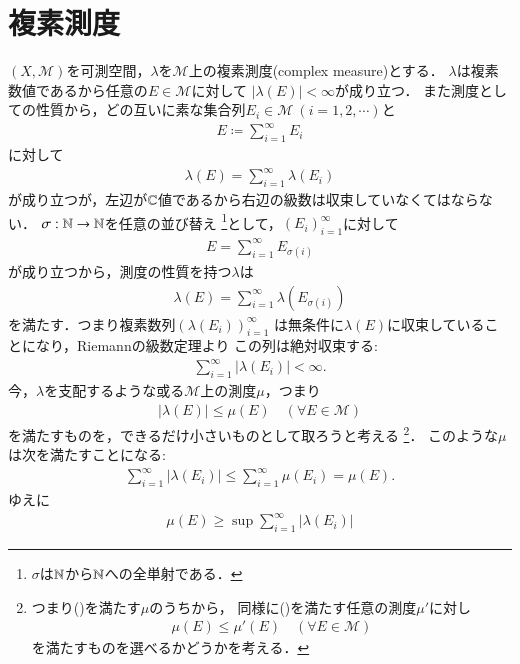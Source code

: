 \section{複素測度}
	$(X,\mathcal{M})$を可測空間，$\lambda$を$\mathcal{M}$上の複素測度(complex measure)とする．
	$\lambda$は複素数値であるから任意の$E \in \mathcal{M}$に対して
	$|\lambda(E)| < \infty$が成り立つ．
	また測度としての性質から，どの互いに素な集合列$E_i \in \mathcal{M}\ (i=1,2,\cdots)$と
	\begin{align}
		E \coloneqq \sum_{i=1}^{\infty} E_i
	\end{align}
	に対して
	\begin{align}
		\lambda(E) = \sum_{i=1}^{\infty} \lambda(E_i)
	\end{align}
	が成り立つが，左辺が$\mathbb{C}$値であるから右辺の級数は収束していなくてはならない．
	$\sigma:\mathbb{N} \rightarrow \mathbb{N}$を任意の並び替え
	\footnote{
		$\sigma$は$\mathbb{N}$から$\mathbb{N}$への全単射である．
	}として，$(E_i)_{i=1}^{\infty}$に対して
	\begin{align}
		E = \sum_{i=1}^{\infty}E_{\sigma(i)}
	\end{align}
	が成り立つから，測度の性質を持つ$\lambda$は
	\begin{align}
		\lambda(E) = \sum_{i=1}^{\infty} \lambda(E_{\sigma(i)})
	\end{align}
	を満たす．つまり複素数列$\left( \lambda(E_i) \right)_{i=1}^{\infty}$
	は無条件に$\lambda(E)$に収束していることになり，Riemannの級数定理より
	この列は絶対収束する:
	\begin{align}
		\sum_{i=1}^{\infty} |\lambda(E_i)| < \infty.
	\end{align}
	今，$\lambda$を支配するような或る$\mathcal{M}$上の測度$\mu$，つまり
	\begin{align}
		|\lambda(E)| \leq \mu(E) \quad (\forall E \in \mathcal{M})
		\label{radon_nikodym_1}
	\end{align}
	を満たすものを，できるだけ小さいものとして取ろうと考える
	\footnote{
		つまり()を満たす$\mu$のうちから，
		同様に()を満たす任意の測度$\mu'$に対し
		\begin{align}
			\mu(E) \leq \mu'(E) \quad (\forall E \in \mathcal{M})
		\end{align}
		を満たすものを選べるかどうかを考える．
	}．
	このような$\mu$は次を満たすことになる:
	\begin{align}
		\sum_{i=1}^{\infty} |\lambda(E_i)| \leq \sum_{i=1}^{\infty} \mu(E_i) = \mu(E).
	\end{align}
	ゆえに
	\begin{align}
		\mu(E) \geq \sup{}{\sum_{i=1}^{\infty} |\lambda(E_i)|} 
		\label{radon_nikodym_2}
	\end{align}
